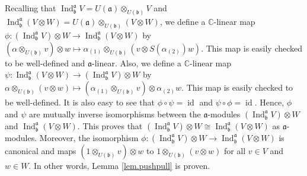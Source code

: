\documentclass
[numbers=enddot,12pt,final,onecolumn,german,notitlepage]{scrartcl}%
\theoremstyle{definition}
\begin{document}
Recalling that $\operatorname*{Ind}\nolimits_{\mathfrak{b}}^{\mathfrak{a}%
}V=U\left(  \mathfrak{a}\right)  \otimes_{U\left(  \mathfrak{b}\right)  }V$
and $\operatorname*{Ind}\nolimits_{\mathfrak{b}}^{\mathfrak{a}}\left(
V\otimes W\right)  =U\left(  \mathfrak{a}\right)  \otimes_{U\left(
\mathfrak{b}\right)  }\left(  V\otimes W\right)  $, we define a $\mathbb{C}%
$-linear map $\phi:\left(  \operatorname*{Ind}\nolimits_{\mathfrak{b}%
}^{\mathfrak{a}}V\right)  \otimes W\rightarrow\operatorname*{Ind}%
\nolimits_{\mathfrak{b}}^{\mathfrak{a}}\left(  V\otimes W\right)  $ by
$\left(  \alpha\otimes_{U\left(  \mathfrak{b}\right)  }v\right)  \otimes
w\mapsto\alpha_{\left(  1\right)  }\otimes_{U\left(  \mathfrak{b}\right)
}\left(  v\otimes S\left(  \alpha_{\left(  2\right)  }\right)  w\right)  $.
This map is easily checked to be well-defined and $\mathfrak{a}$-linear. Also,
we define a $\mathbb{C}$-linear map $\psi:\operatorname*{Ind}%
\nolimits_{\mathfrak{b}}^{\mathfrak{a}}\left(  V\otimes W\right)
\rightarrow\left(  \operatorname*{Ind}\nolimits_{\mathfrak{b}}^{\mathfrak{a}%
}V\right)  \otimes W$ by $\alpha\otimes_{U\left(  \mathfrak{b}\right)
}\left(  v\otimes w\right)  \mapsto\left(  \alpha_{\left(  1\right)  }%
\otimes_{U\left(  \mathfrak{b}\right)  }v\right)  \otimes\alpha_{\left(
2\right)  }w$. This map is easily checked to be well-defined. It is also easy
to see that $\phi\circ\psi=\operatorname*{id}$ and $\psi\circ\phi
=\operatorname*{id}$. Hence, $\phi$ and $\psi$ are mutually inverse
isomorphisms between the $\mathfrak{a}$-modules $\left(  \operatorname*{Ind}%
\nolimits_{\mathfrak{b}}^{\mathfrak{a}}V\right)  \otimes W$ and
$\operatorname*{Ind}\nolimits_{\mathfrak{b}}^{\mathfrak{a}}\left(  V\otimes
W\right)  $. This proves that $\left(  \operatorname*{Ind}%
\nolimits_{\mathfrak{b}}^{\mathfrak{a}}V\right)  \otimes W\cong%
\operatorname*{Ind}\nolimits_{\mathfrak{b}}^{\mathfrak{a}}\left(  V\otimes
W\right)  $ as $\mathfrak{a}$-modules. Moreover, the isomorphism $\phi:\left(
\operatorname*{Ind}\nolimits_{\mathfrak{b}}^{\mathfrak{a}}V\right)  \otimes
W\rightarrow\operatorname*{Ind}\nolimits_{\mathfrak{b}}^{\mathfrak{a}}\left(
V\otimes W\right)  $ is canonical and maps $\left(  1\otimes_{U\left(
\mathfrak{b}\right)  }v\right)  \otimes w$ to $1\otimes_{U\left(
\mathfrak{b}\right)  }\left(  v\otimes w\right)  $ for all $v\in V$ and $w\in
W$. In other words, Lemma \ref{lem.pushpull} is proven.
\end{document}
